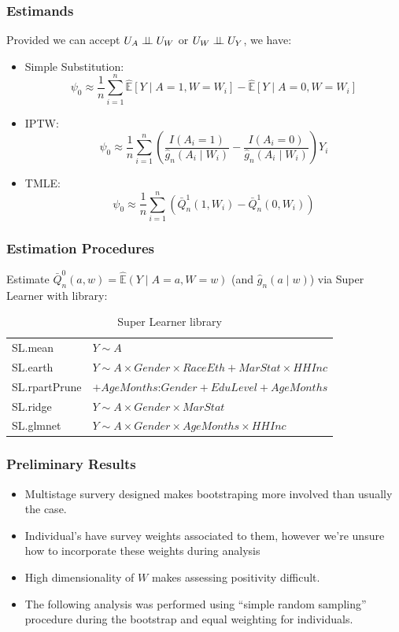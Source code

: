 \documentclass{beamer}
\newcommand{\E}{\mathbb{E}}
\newcommand{\indp}{\ensuremath{\perp\hspace{-5pt}\perp}}
\DeclareMathOperator{\logit}{logit}
\begin{document}
\begin{frame}
\frametitle{Estimands}
Provided we can accept $U_A \indp U_W$ or $U_W \indp U_Y$, we have:
\begin{itemize}
  \item Simple Substitution:
    \[
      \psi_0 \approx \frac{1}{n}\sum_{i=1}^{n}\widehat{\E}\left[Y \mid A=1, W=W_i \right] - \widehat{\E}\left[Y \mid A=0, W=W_i\right]
    \]
  \item IPTW:
  \[
    \psi_{0} \approx \frac{1}{n}\sum_{i=1}^{n} \left(\frac{I(A_i=1)}{\hat{g}_n(A_i \mid W_i)} - \frac{I(A_i=0)}{\hat{g}_n(A_i \mid W_i)} \right)Y_i
  \]
  \item TMLE:
  \[
    \psi_{0} \approx \frac{1}{n}\sum_{i=1}^{n}\left( \bar{Q}_{n}^{1}(1,W_i) - \bar{Q}_{n}^{1}(0,W_i)\right)
  \]
\end{itemize}
\end{frame}

\begin{frame}
\frametitle{Estimation Procedures}
Estimate $\bar{Q}_{n}^{0}(a,w) = \widehat{\E}(Y \mid A=a, W=w)$ (and $\hat{g}_{n}(a\mid w)$) via Super Learner with library:
\begin{table}[ht!]
\begin{tabular}{ll}
SL.mean & $Y \sim A$ \\
SL.earth & $Y \sim A \times Gender \times RaceEth + MarStat \times HHInc$ \\
SL.rpartPrune & $+ AgeMonths$:$Gender + EduLevel + AgeMonths $ \\
SL.ridge & $Y \sim A \times Gender \times MarStat$ \\
SL.glmnet &  $Y \sim A \times Gender \times AgeMonths \times HHInc$ \\
\end{tabular}
\caption{Super Learner library}
\end{table}
\end{frame}

\begin{frame}
\frametitle{Preliminary Results}
\begin{itemize}
\item Multistage survery designed makes bootstraping more involved than usually the case.
\item Individual's have survey weights associated to them, however we're unsure how to incorporate these weights during analysis
\item High dimensionality of $W$ makes assessing positivity difficult.
\item The following analysis was performed using ``simple random sampling'' procedure during the bootstrap and equal weighting for individuals.
\end{itemize}
\end{frame}
\end{document}
